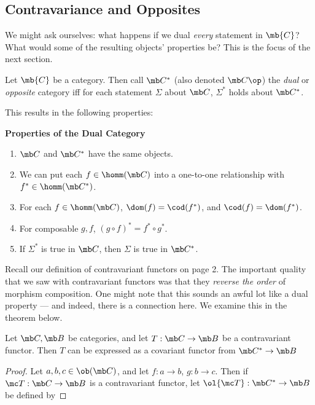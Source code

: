 \documentclass[nocover]{pset}
\begin{document}
\begin{adjustwidth}{1em}{1em}
  \subsection{Contravariance and Opposites}
  We might ask ourselves: what happens if we dual \emph{every}
  statement in $\mb{C}$? What would some of the resulting objects'
  properties be? This is the focus of the next section.
  \begin{definition}
    Let $\mb{C}$ be a category. Then call $\mb C^*$ (also denoted
    $\mb C\op$) the \emph{dual} or \emph{opposite} category iff for
    each statement $\Sigma$ about $\mb C$, $\Sigma^*$ holds about $\mb
    C^*$.
  \end{definition}
  This results in the following properties:
  \begin{leftbar}
    {\large \bfseries Properties of the Dual Category}
    \begin{enumerate}[label=\arabic*)]
      \item $\mb C$ and $\mb C^*$ have the same objects.
      \item We can put each $f \in \homm(\mb C)$ into a one-to-one
        relationship with $f^* \in \homm(\mb C^*)$.
      \item For each $f \in \homm(\mb C)$, $\dom(f) = \cod(f^*)$, and
        $\cod(f) = \dom(f^*)$.
      \item For composable $g,f$, $(g \circ f)^* = f^* \circ g^*$.
      \item If $\Sigma^*$ is true in $\mb C$, then $\Sigma$ is true in
        $\mb C^*$.
    \end{enumerate}
  \end{leftbar}
  Recall our definition of contravariant functors on page 2. The
  important quality that we saw with contravariant functors was that
  they \emph{reverse the order} of morphism composition. One might
  note that this sounds an awful lot like a dual property --- and
  indeed, there is a connection here. We examine this in the theorem
  below.
  \begin{theorem}
    Let $\mb C, \mb B$ be categories, and let $T : \mb C \to \mb B$ be
    a contravariant functor. Then $T$ can be expressed as a covariant
    functor from $\mb C^* \to \mb B$
  \end{theorem}
  \begin{proof}
    Let $a,b,c \in \ob(\mb C)$, and let $f : a \to b$, $g : b \to c$.
    Then if $\mc T : \mb C \to \mb B$ is a contravariant functor, let
    $\ol{\mc T} : \mb C^* \to \mb B$ be defined by

\end{proof}
\end{adjustwidth}
\end{document}

